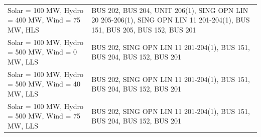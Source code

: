\documentclass[10pt]{report}
\begin{document}
\begin{table}[H]
{\begin{tabular}{lp{15cm}}
Solar = 100 MW, Hydro = 400 MW, Wind = 75 MW, HLS & BUS 202, BUS 204, UNIT 206(1), SING OPN LIN   20 205-206(1), SING OPN LIN   11 201-204(1), BUS 151, BUS 205, BUS 152, BUS 201 \\
Solar = 100 MW, Hydro = 500 MW, Wind = 0 MW, LLS & BUS 202, SING OPN LIN   11 201-204(1), BUS 151, BUS 204, BUS 152, BUS 201 \\
Solar = 100 MW, Hydro = 500 MW, Wind = 40 MW, LLS & BUS 202, SING OPN LIN   11 201-204(1), BUS 151, BUS 204, BUS 152, BUS 201 \\
Solar = 100 MW, Hydro = 500 MW, Wind = 75 MW, LLS & BUS 202, SING OPN LIN   11 201-204(1), BUS 151, BUS 204, BUS 152, BUS 201 \\

\bottomrule
\end{tabular}}
\end{table}
\end{document}
